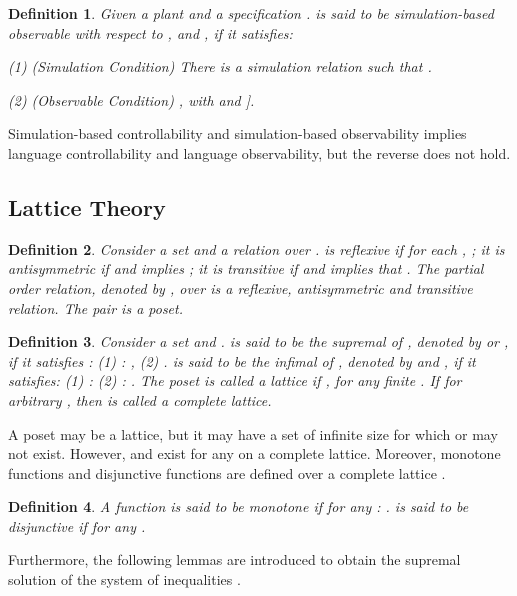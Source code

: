\documentclass[12pt,draftcls,onecolumn]{IEEEtran}
\newtheorem{Definition}{Definition}
\begin{document}
\begin{Definition}
Given a plant  and a
specification .  is said to
be simulation-based observable with respect to , 
and , if it satisfies:

(1) (Simulation Condition) There is a simulation relation 
such that .

(2) (Observable Condition) ,  with     and ].
\end{Definition}

Simulation-based controllability and simulation-based
observability implies language controllability and language
observability, but the reverse does not hold.

\subsection{Lattice Theory}






\begin{Definition}
Consider a set  and a relation  over .
 is reflexive if for each , ; it is
antisymmetric if  and  implies ; it
is transitive if  and  implies that . The partial order relation, denoted by , over 
is a reflexive, antisymmetric and transitive relation. The pair  is a poset.
\end{Definition}

\begin{Definition}
Consider a set  and .  is said to be the
supremal of , denoted by  or , if it satisfies :
(1) : , (2) .  is said to be the infimal of ,
denoted by  and , if it satisfies: (1) :  (2)  : . The poset  is called a
lattice if ,  for any finite . If  for arbitrary , then  is called a
complete lattice.
\end{Definition}

A poset may be a lattice, but it may have a set  of infinite
size for which  or  may not exist. However,  and
 exist for any  on a complete lattice.
Moreover, monotone functions and disjunctive functions are defined
over a complete lattice .

\begin{Definition}
A function  is said to be monotone if for any
 : .  is
said to be disjunctive if for any .
\end{Definition}




Furthermore, the following lemmas are introduced to obtain the
supremal solution of the system of inequalities \cite{kb}.
\end{document}
